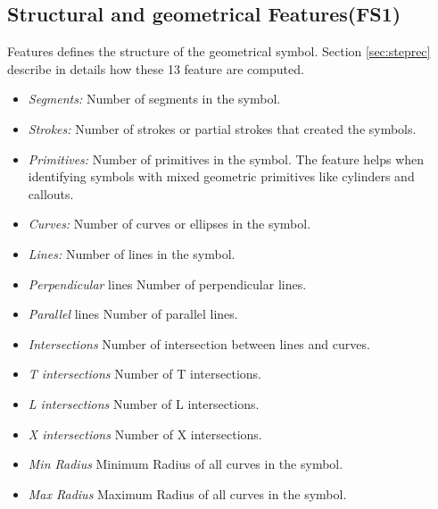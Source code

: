 \subsection{Structural and geometrical Features(FS1)}
 Features defines the structure of the geometrical symbol. Section \ref{sec:steprec} describe in details how these 13 feature are computed.  
  \begin{itemize}
	 \item \emph{Segments:} Number of segments in the symbol.
	 \item \emph{Strokes:} Number of strokes or partial strokes that created the symbols.  
		\item  \emph{Primitives:} Number of primitives in the symbol. The feature helps when identifying             symbols with mixed geometric primitives like cylinders and callouts.  
		\item \emph{Curves:} Number of curves or ellipses in the symbol. 
		\item \emph{Lines:} Number of lines in the symbol. 
		\item \emph{Perpendicular} lines Number of perpendicular lines. 
		\item \emph{Parallel} lines Number of parallel lines. 
		\item \emph{Intersections} Number of intersection between lines and curves. 
		\item \emph{T intersections} Number of T intersections. 
		\item \emph{L intersections} Number of L intersections. 
		\item \emph{X intersections} Number of X intersections.
		\item \emph{Min Radius} Minimum Radius of all curves in the symbol.
		\item \emph{Max Radius} Maximum Radius of all curves in the symbol.
\end{itemize}
